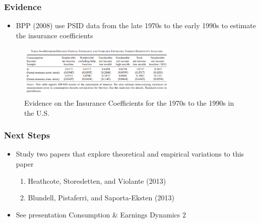 \begin{frame}
	\frametitle{Evidence}
		\begin{itemize}
			\item BPP (2008) use PSID data from the late 1970s to the early 1990s to estimate the insurance coefficients 
		\end{itemize}

\begin{center}
\begin{figure}[H]
\caption*{Evidence on the Insurance Coefficients for the 1970s to the 1990s in the U.S.}
\centering
\includegraphics[width=3in, height=1in]{Table8BPP_2008.png}
\end{figure}
\end{center}	

\end{frame}

\begin{frame}
	\frametitle{Next Steps}
		\begin{itemize}
			\item Study two papers that explore theoretical and empirical variations to this paper
				\begin{enumerate}
					\item Heathcote, Storesletten, and Violante (2013)
					\item Blundell, Pistaferri, and Saporta-Eksten (2013)
				\end{enumerate}
			\item See presentation Consumption \& Earnings Dynamics 2
		\end{itemize}

\end{frame}




